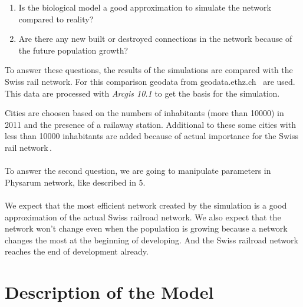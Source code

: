 \documentclass[11pt]{scrartcl}
\begin{document}
\begin{enumerate}
	\item Is the biological model a good approximation to simulate the network compared to reality?
	\item Are there any new built or destroyed connections in the network because of the future population growth?
\end{enumerate}

To answer these questions, the results of the simulations are compared with the Swiss rail network. For this comparison geodata from geodata.ethz.ch~\cite{gis_data} are used. This data are processed with \textit{Arcgis 10.1} to get the basis for the simulation.

Cities are choosen based on the numbers of inhabitants (more than 10000) in 2011 and the presence of a railaway station. Additional to these some cities with less than 10000 inhabitants are added because of actual importance for the Swiss rail network\,\cite{bfs}. ~\\
~\\
To answer the second question, we are going to manipulate parameters in Physarum network, like described  in 5.\\
~\\
We expect that the most efficient network created by the simulation is a good approximation of the actual Swiss railroad network. We also expect that the network won't change even when the population is growing because a network changes the most at the beginning of developing. And the Swiss railroad network reaches the end of development already.




\section{Description of the Model}
\end{document}
